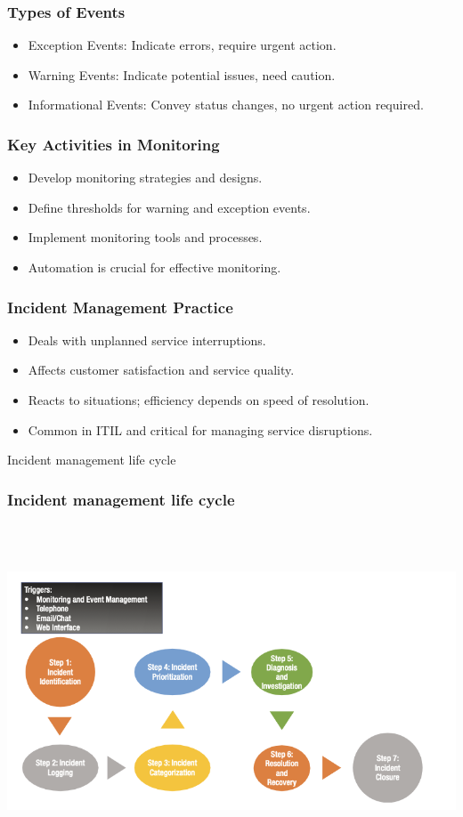 \documentclass[aspectratio=169, table]{beamer}
\begin{document}
\begin{frame}
	\frametitle{Types of Events}
	
	\begin{itemize}
		\item Exception Events: Indicate errors, require urgent action.
		\item Warning Events: Indicate potential issues, need caution.
		\item Informational Events: Convey status changes, no urgent action required.
	\end{itemize}
\end{frame}

\begin{frame}
	\frametitle{Key Activities in Monitoring}
	
	\begin{itemize}
		\item Develop monitoring strategies and designs.
		\item Define thresholds for warning and exception events.
		\item Implement monitoring tools and processes.
		\item Automation is crucial for effective monitoring.
	\end{itemize}
\end{frame}

\begin{frame}
	\frametitle{Incident Management Practice}
	
	\begin{itemize}
		\item Deals with unplanned service interruptions.
		\item Affects customer satisfaction and service quality.
		\item Reacts to situations; efficiency depends on speed of resolution.
		\item Common in ITIL and critical for managing service disruptions.
	\end{itemize}
\end{frame}

\begin{frame}{Incident management life cycle} 	 \frametitle{Incident management life cycle} \begin{center} 	\includegraphics[width=0.8\linewidth]{images/image-01.png} \end{center} \end{frame}
\end{document}
